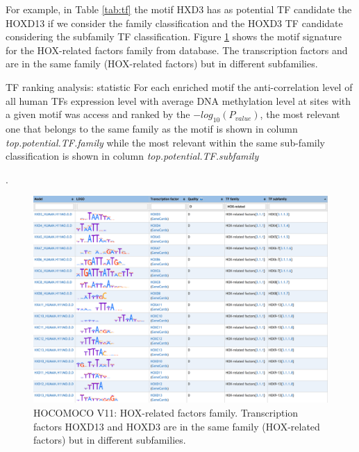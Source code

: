 For example, in Table \ref{tab:tf} the motif HXD3 has as potential TF candidate the HOXD13 if we consider the family  classification and the HOXD3 TF candidate considering the subfamily TF classification. Figure \ref{tab:hocomoco} shows the motif signature for the HOX-related factors family from  database. The transcription factors  and  are in the same family (HOX-related factors) but in different subfamilies.



\begin{table}[h!]
\centering
\caption[G-CIMP analysis: TF ranking plot]{TF ranking analysis: statistic For each enriched motif the anti-correlation level of all human TFs expression level with average DNA methylation level at sites with a given motif was access and ranked by the $-log_{10}(P_{value})$, the most relevant one that belongs to the same family as the motif is shown in column \textit{top.potential.TF.family} while the most relevant within the same sub-family classification is shown in column \textit{top.potential.TF.subfamily}}.
\label{tab:tf}
\end{table}

\begin{center}
\begin{figure}[h!]
\includegraphics[width=16cm]{images/HOCOMOCO.png}
\caption[HOCOMOCO: HOX-related factors family]{\label{tab:hocomoco}HOCOMOCO V11: HOX-related factors family. Transcription factors HOXD13 and HOXD3 are in the same family (HOX-related factors) but in different subfamilies.}
\end{figure}

\end{center}


